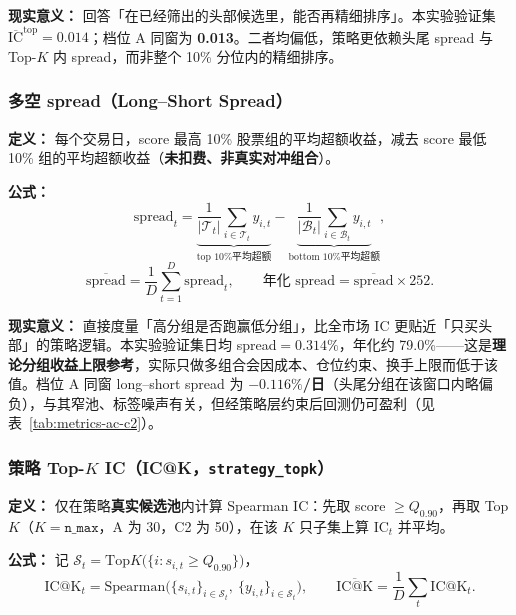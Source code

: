 \documentclass[UTF8,a4paper,12pt]{ctexart}
\begin{document}
\textbf{现实意义：} 回答「在已经筛出的头部候选里，能否再精细排序」。本实验验证集 $\overline{\mathrm{IC}}^{\mathrm{top}}=0.014$；档位 A 同窗为 \textbf{0.013}。二者均偏低，策略更依赖头尾 spread 与 Top-$K$ 内 spread，而非整个 10\% 分位内的精细排序。

\subsubsection{多空 spread（Long--Short Spread）}

\textbf{定义：} 每个交易日，score 最高 10\% 股票组的平均超额收益，减去 score 最低 10\% 组的平均超额收益（\textbf{未扣费、非真实对冲组合}）。

\textbf{公式：}
\begin{equation}
  \mathrm{spread}_t
  = \underbrace{\frac{1}{|\mathcal T_t|}\sum_{i\in\mathcal T_t} y_{i,t}}_{\text{top 10\% 平均超额}}
  - \underbrace{\frac{1}{|\mathcal B_t|}\sum_{i\in\mathcal B_t} y_{i,t}}_{\text{bottom 10\% 平均超额}},
\end{equation}
\begin{equation}
  \overline{\mathrm{spread}} = \frac{1}{D}\sum_{t=1}^{D}\mathrm{spread}_t,
  \qquad
  \text{年化 spread} = \overline{\mathrm{spread}}\times 252.
\end{equation}

\textbf{现实意义：} 直接度量「高分组是否跑赢低分组」，比全市场 IC 更贴近「只买头部」的策略逻辑。本实验验证集日均 spread$=0.314\%$，年化约 79.0\%——这是\textbf{理论分组收益上限参考}，实际只做多组合会因成本、仓位约束、换手上限而低于该值。档位 A 同窗 long--short spread 为 \textbf{$-0.116\%$/日}（头尾分组在该窗口内略偏负），与其窄池、标签噪声有关，但经策略层约束后回测仍可盈利（见表~\ref{tab:metrics-ac-c2}）。

\subsubsection{策略 Top-$K$ IC（IC@K，\texttt{strategy\_topk}）}

\textbf{定义：} 仅在策略\textbf{真实候选池}内计算 Spearman IC：先取 score $\ge Q_{0.90}$，再取 Top $K$（$K=\texttt{n\_max}$，A 为 30，C2 为 50），在该 $K$ 只子集上算 $\mathrm{IC}_t$ 并平均。

\textbf{公式：} 记 $\mathcal S_t=\mathrm{Top}K\big(\{i: s_{i,t}\ge Q_{0.90}\}\big)$，
\begin{equation}
  \mathrm{IC@K}_t = \mathrm{Spearman}\big(\{s_{i,t}\}_{i\in\mathcal S_t},\ \{y_{i,t}\}_{i\in\mathcal S_t}\big),
  \qquad
  \overline{\mathrm{IC@K}} = \frac{1}{D}\sum_t \mathrm{IC@K}_t.
\end{equation}
\end{document}
